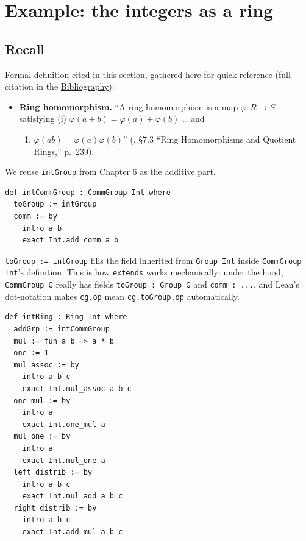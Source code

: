 \section{Example: the integers as a ring}\label{sec:08-rings:04-integers-example:1}

\subsection{Recall}\label{sec:08-rings:04-integers-example:2}

Formal definition cited in this section, gathered here for quick reference (full citation in the \hyperref[sec:root:bibliography:1]{Bibliography}):

\begin{itemize}
\tightlist
\item
  \textbf{Ring homomorphism.} ``A ring homomorphism is a map \(\varphi : R
  \to S\) satisfying (i) \(\varphi(a+b) = \varphi(a)+\varphi(b)\) \ldots{} and

  \begin{enumerate}
  \def\labelenumi{(\roman{enumi})}
  \setcounter{enumi}{1}
  \tightlist
  \item
    \(\varphi(ab) = \varphi(a)\varphi(b)\)'' (\cite{DummitFoote2003}, §7.3 ``Ring Homomorphisms and Quotient Rings,'' p.~239).
  \end{enumerate}
\end{itemize}

We reuse \texttt{intGroup} from Chapter 6 as the additive part.

\begin{lstlisting}
def intCommGroup : CommGroup Int where
  toGroup := intGroup
  comm := by
    intro a b
    exact Int.add_comm a b
\end{lstlisting}

\texttt{toGroup := intGroup} fills the field inherited from \texttt{Group Int} inside \texttt{CommGroup Int}'s definition. This is how \texttt{extends} works mechanically: under the hood, \texttt{CommGroup G} really has fields \texttt{toGroup : Group G} and \texttt{comm : ...}, and Lean's dot-notation makes \texttt{cg.op} mean \texttt{cg.toGroup.op} automatically.

\begin{lstlisting}
def intRing : Ring Int where
  addGrp := intCommGroup
  mul := fun a b => a * b
  one := 1
  mul_assoc := by
    intro a b c
    exact Int.mul_assoc a b c
  one_mul := by
    intro a
    exact Int.one_mul a
  mul_one := by
    intro a
    exact Int.mul_one a
  left_distrib := by
    intro a b c
    exact Int.mul_add a b c
  right_distrib := by
    intro a b c
    exact Int.add_mul a b c
\end{lstlisting}

